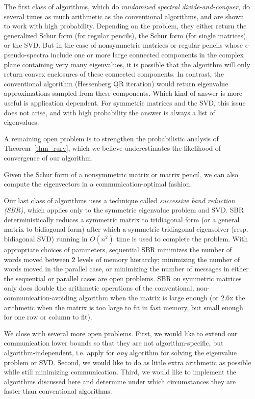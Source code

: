 \documentclass{article}
\theoremstyle{definition}
\begin{document}
The first class of algorithms, which do {\em randomized
spectral divide-and-conquer}, do several times as much
arithmetic as the conventional algorithms, and are shown 
to work with high probability. Depending on the problem,
they either return the generalized Schur form (for regular
pencils), the Schur form (for single matrices), or the SVD.
But in the case of nonsymmetric matrices
or regular pencils whose $\epsilon$-pseudo-spectra include 
one or more large connected components in the complex plane 
containing very many eigenvalues, it is possible that the 
algorithm will only return convex enclosures of these
connected components. In contrast, the conventional algorithm 
(Hessenberg QR iteration) would return eigenvalue approximations
sampled from these components. Which kind of answer is 
more useful is application dependent. For symmetric matrices
and the SVD, this issue does not arise, and with high probability
the answer is always a list of eigenvalues.

A remaining open problem is to strengthen the probabilistic analysis
of Theorem~\ref{thm_rurv}, which we believe underestimates the
likelihood of convergence of our algorithm.

Given the Schur form of a nonsymmetric matrix or matrix pencil,
we can also compute the eigenvectors in a communication-optimal
fashion.

Our last class of algorithms uses a technique called 
{\em successive band reduction (SBR)}, which applies only to the
symmetric eigenvalue problem and SVD. SBR deterministically
reduces a symmetric matrix to tridiagonal form (or a general
matrix to bidiagonal form) after which a symmetric
tridiagonal eigensolver (resp. bidiagonal SVD) running in $O(n^2)$
time is used to complete the problem. With appropriate
choices of parameters, sequential SBR minimizes the number of 
words moved between 2 levels of memory hierarchy; minimizing
the number of words moved in the parallel case, or minimizing
the number of messages in either the sequential or parallel
cases are open problems.
SBR on symmetric matrices only does double the arithmetic operations 
of the conventional, non-communication-avoiding algorithm when
the matrix is large enough  (or 2.6x the arithmetic 
when the matrix is too large to fit in fast memory, 
but small enough for one row or column to fit).

We close with several more open problems. First, we would like to
extend our communication lower bounds so that they are not
algorithm-specific, but algorithm-independent, i.e. apply for
{\em any} algorithm for solving the eigenvalue problem or SVD.
Second, we would like to do as little extra arithmetic as possible
while still minimizing communication. Third, we would like to 
implement the algorithms discussed here and determine under which
circumstances they are faster than conventional algorithms.
\end{document}
